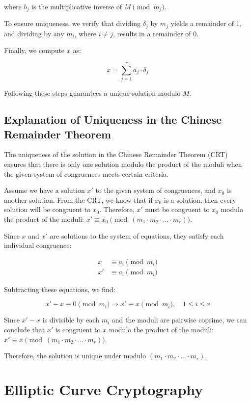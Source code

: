\documentclass[11pt]{article}
\begin{document}
where $b_j$ is the multiplicative inverse of $M \pmod{m_j}$.

To ensure uniqueness, we verify that dividing $\delta_j$ by $m_j$ yields a remainder of 1, and dividing by any $m_i$, where $i \neq j$, results in a remainder of 0.

Finally, we compute $x$ as:

\[
x = \sum_{j=1}^{r} a_j \cdot \delta_j
\]

Following these steps guarantees a unique solution modulo $M$.

\subsection{Explanation of Uniqueness in the Chinese Remainder Theorem}

The uniqueness of the solution in the Chinese Remainder Theorem (CRT) ensures that there is only one solution modulo the product of the moduli when the given system of congruences meets certain criteria.

Assume we have a solution $x'$ to the given system of congruences, and $x_0$ is another solution. From the CRT, we know that if $x_0$ is a solution, then every solution will be congruent to $x_0$. Therefore, $x'$ must be congruent to $x_0$ modulo the product of the moduli: $x' \equiv x_0 \pmod{(m_1 \cdot m_2 \cdot \ldots \cdot m_r)}$.

Since $x$ and $x'$ are solutions to the system of equations, they satisfy each individual congruence:

\[
\begin{aligned}
x &\equiv a_i \pmod{m_i} \\
x' &\equiv a_i \pmod{m_i}
\end{aligned}
\]

Subtracting these equations, we find:

\[
x' - x \equiv 0 \pmod{m_i} \Rightarrow x' \equiv x \pmod{m_i}, \quad 1 \leq i \leq r
\]

Since $x' - x$ is divisible by each $m_i$ and the moduli are pairwise coprime, we can conclude that $x'$ is congruent to $x$ modulo the product of the moduli: $x' \equiv x \pmod{(m_1 \cdot m_2 \cdot \ldots \cdot m_r)}$.

Therefore, the solution is unique under modulo $(m_1 \cdot m_2 \cdot \ldots \cdot m_r)$.

\section{Elliptic Curve Cryptography}
\end{document}

